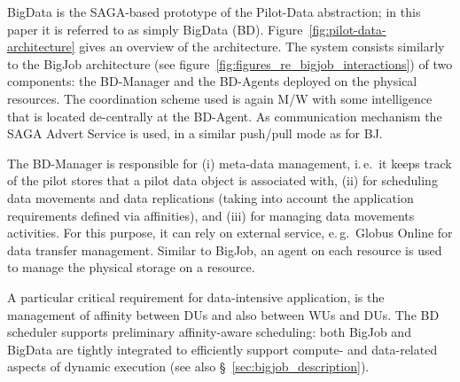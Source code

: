 BigData is the SAGA-based prototype of the Pilot-Data
abstraction; in this paper it is referred to as simply
BigData (BD).  Figure~\ref{fig:pilot-data-architecture} gives an
overview of the architecture.  The system consists similarly to the BigJob 
architecture (see figure~\ref{fig:figures_re_bigjob_interactions}) of two 
components: the BD-Manager and the BD-Agents deployed on the physical
resources. The coordination scheme used is again M/W with some
intelligence that is located de-centrally at the BD-Agent. As
communication mechanism the SAGA Advert Service is used, in a similar
push/pull mode as for BJ.

The BD-Manager is responsible for (i) meta-data management, i.\,e.\ it
keeps track of the pilot stores that a pilot data object is associated
with, (ii) for scheduling data movements and data replications (taking
into account the application requirements defined via affinities), and
(iii) for managing data movements activities. For this purpose, it can rely
on external service, e.\,g.\ Globus Online for data transfer management.  
Similar to BigJob, an agent on each resource is used to manage the physical 
storage on a resource.  

A particular critical requirement for data-intensive application, is
the management of affinity between DUs and also between WUs and
DUs. The BD scheduler supports preliminary affinity-aware
scheduling: both BigJob and BigData are tightly integrated to
efficiently support compute- and data-related aspects of dynamic
execution (see also \S~\ref{sec:bigjob_description}).
 




